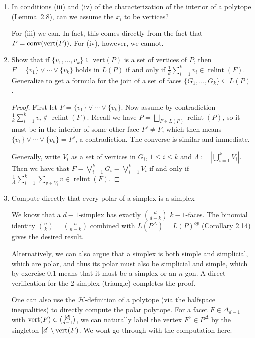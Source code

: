 \documentclass{article}
\begin{document}
\begin{enumerate}
\item In conditions (iii) and (iv) of the characterization of the interior of a polytope (Lemma~2.8), can we assume the $x_i$ to be vertices?

\begin{solution}
    For (iii) we can. In fact, this comes directly from the fact that $P = \operatorname{conv}(\textup{vert}(P))$. For (iv), however, we cannot.
\end{solution}

\item Show that if $\{v_1,\ldots,v_k\} \subseteq \mathrm{vert}(P)$ is a set of vertices of $P$, then $F = \{v_1\} \vee \cdots \vee \{v_k\}$ holds in $L(P)$ if and only if $\frac{1}{k}\sum_{i=1}^k v_i \in \operatorname{relint}(F)$. Generalize to get a formula for the join of a set of faces $\{G_1,\ldots,G_k\} \subseteq L(P)$.

\begin{proof}
First let $F = \{v_1\} \vee \cdots \vee \{v_k\}$. Now assume by contradiction $\frac{1}{k}\sum_{i=1}^k v_i \notin \operatorname{relint}(F)$. Recall we have $P = \bigsqcup_{F \in L(P)}\operatorname{relint}(P)$, so it must be in the interior of some other face $F' \neq F$, which then means $\{v_1\} \vee \cdots \vee \{v_k\} = F'$, a contradiction. The converse is similar and immediate.

Generally, write $V_i$ as a set of vertices in $G_i$, $1 \leq i \leq k$ and $\Lambda := |\bigcup_{i=1}^k V_i|$. Then we have that $F = \bigvee_{i=1}^k G_i = \bigvee_{i = 1}^k V_i$ if and only if $\frac{1}{\Lambda}\sum_{i=1}^k \sum_{ v\in V_i} v \in \operatorname{relint}(F)$.
\end{proof}

\item Compute directly that every polar of a simplex is a simplex

\begin{solution}
We know that a $d-1$-simplex has exactly $\binom{d}{d-k}$ $k-1$-faces. The binomial identity $\binom{n}{k} = \binom{n}{n-k}$ combined with $L(P^\Delta) = L(P)^{op}$ (Corollary 2.14) gives the desired result.

Alternatively, we can also argue that a simplex is both simple and simplicial, which are polar, and thus its polar must also be simplicial and simple, which by exercise 0.1 means that it must be a simplex or an $n$-gon. A direct verification for the $2$-simplex (triangle) completes the proof.

\begin{remark}
    One can also use the $\mathcal{H}$-definition of a polytope (via the halfspace inequalities) to directly compute the polar polytope. For a facet $F \in \Delta_{d-1}$ with $\textup{vert}(F) \in \binom{[d]}{d-1}$, we can naturally label the vertex $F^\diamond \in P^{\Delta}$ by the singleton $[d] \setminus \textup{vert}(F)$. We wont go through with the computation here.
\end{remark}
\end{solution}


\end{enumerate}
\end{document}
